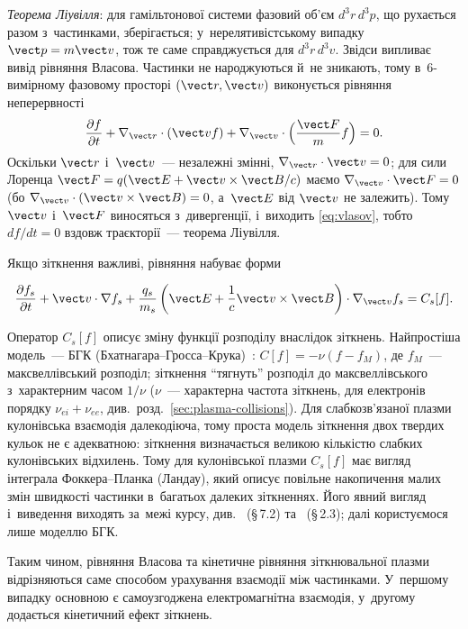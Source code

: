\begin{Theory}
\emph{Теорема Ліувілля}: для гамільтонової системи фазовий об'єм $d^3r\,d^3p$, що рухається разом
з~частинками, зберігається; у~нерелятивістському випадку $\vect p=m\vect v$, тож те саме справджується для $d^3r\,d^3v$. Звідси випливає вивід рівняння Власова. Частинки не народжуються й~не зникають,
тому в~6-вимірному фазовому просторі $(\vect r,\vect v)$ виконується рівняння неперервності
\[\frac{\partial f}{\partial t}+\nabla_{\vect r}\cdot(\vect vf)+\nabla_{\vect v}\cdot\Bigl(\frac{\vect F}mf\Bigr)=0.\]
Оскільки $\vect r$ і~$\vect v$~--- незалежні змінні, $\nabla_{\vect r}\cdot\vect v=0$; для сили Лоренца
$\vect F=q(\vect E+\vect v\times\vect B/c)$ маємо $\nabla_{\vect v}\cdot\vect F=0$ (бо $\nabla_{\vect v}\cdot(\vect v\times\vect B)=0$,
а~$\vect E$ від $\vect v$ не залежить). Тому $\vect v$ і~$\vect F$ виносяться з~дивергенції, і~виходить
\eqref{eq:vlasov}, тобто $df/dt=0$ вздовж траєкторії~--- теорема Ліувілля.
\end{Theory}

Якщо зіткнення важливі, рівняння набуває форми

\begin{equation}\label{eq:kinetic-collision}
\frac{\partial f_s}{\partial t}
+\vect v\cdot\nabla f_s
+\frac{q_s}{m_s}
\left(
\vect E+\frac1c\vect v\times\vect B
\right)
\cdot\nabla_{\vect v}f_s
=C_s[f].
\end{equation}

Оператор $C_s[f]$ описує зміну функції розподілу внаслідок зіткнень. Найпростіша модель~---
БГК (Бхатнагара--Гросса--Крука)~\cite{bhatnagar1954model}: $C[f]=-\nu(f-f_M)$, де $f_M$~--- максвеллівський розподіл; зіткнення \enquote{тягнуть} розподіл до
максвеллівського з~характерним часом $1/\nu$ ($\nu$~--- характерна частота зіткнень, для електронів порядку $\nu_{ei}+\nu_{ee}$, див.~розд.~\ref{sec:plasma-collisions}). Для слабкозв'язаної
плазми кулонівська взаємодія далекодіюча, тому проста модель зіткнення двох твердих кульок
не є адекватною: зіткнення визначається великою кількістю слабких кулонівських відхилень.
Тому для кулонівської плазми $C_s[f]$ має вигляд інтеграла Фоккера--Планка (Ландау), який описує
повільне накопичення малих змін швидкості частинки в~багатьох далеких зіткненнях. Його явний вигляд і~виведення
виходять за~межі курсу, див.~\cite{chen2016introduction} (§\,7.2) та~\cite{anisimov2018} (§\,2.3); далі
користуємося лише моделлю БГК.

Таким чином, рівняння Власова та кінетичне рівняння зіткнювальної плазми відрізняються
саме способом урахування взаємодії між частинками. У~першому випадку основною є
самоузгоджена електромагнітна взаємодія, у~другому додається кінетичний ефект зіткнень.

